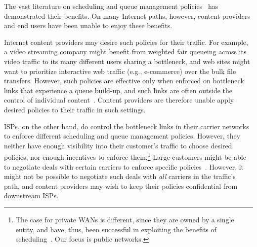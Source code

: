 
The vast literature on scheduling and queue management policies~\cite{diffserv, fair-queueing, sfq, pie, CoDel, fifoplus, virtualClocks, csfq, drr, red, ecn} has demonstrated their benefits.
On many Internet paths, however, content providers and end users have been unable to enjoy these benefits.

Internet content providers may desire such policies for their traffic. For example, a video streaming company might benefit from weighted fair queueing across its video traffic to its many different users sharing a bottleneck, and web sites might want to prioritize  interactive web traffic (e.g., e-commerce) over the bulk file transfers. However, such policies are effective only when enforced on bottleneck links that experience a queue build-up, and such links are often outside the control of individual content~\cite{inferring-interdomain-congestion, isp-throttle-1, isp-throttle-2, isp-throttle-3}. Content providers are therefore unable apply desired policies to their traffic in such settings. 

ISPs, on the other hand, do control the bottleneck links in their carrier networks to enforce different scheduling and queue management policies. However, they neither have enough visibility into their customer's traffic to choose desired policies, nor enough incentives to enforce them.\footnote{The case for private WANs is different, since they are owned by a single entity, and have, thus, been successful in exploiting the benefits of scheduling~\cite{swan, b4, bwe}. Our focus is public networks.} Large customers might be able to negotiate deals with certain carriers to enforce specific policies~\cite{att-qos}. However, it might not be possible to negotiate such deals with \emph{all} carriers in the traffic's path, and content providers may wish to keep their policies confidential from downstream ISPs.

